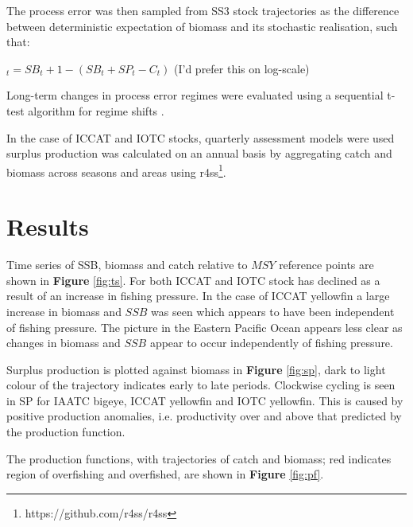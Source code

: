 \documentclass[12pt,doublespacing,a4paper]{ouparticle}
\begin{document}
The process error was then sampled from SS3 stock trajectories as the difference between deterministic expectation of biomass  and its stochastic realisation, such that:

\epsilon$_t = SB_t+1 - (SB_t+SP_t-C_t)$  (I'd prefer this on log-scale)

Long-term changes in process error regimes were evaluated using a sequential t-test algorithm for regime shifts \citep{rodionov2004sequential}.

 In the case of ICCAT and IOTC stocks, quarterly assessment models were used surplus production was calculated on an annual basis by aggregating catch and biomass across seasons and areas using r4ss\footnote{https://github.com/r4ss/r4ss}.
 
\section{Results}

Time series of SSB, biomass and catch relative to $MSY$ reference points are shown in \textbf{Figure} \ref{fig:ts}. For both ICCAT and IOTC stock has declined as a result of an increase in fishing pressure. In the case of ICCAT yellowfin a large increase in biomass and $SSB$ was seen which appears to have been independent of fishing pressure. The picture in the Eastern Pacific Ocean appears less clear as changes in biomass and $SSB$ appear to occur independently of fishing pressure.

Surplus production is plotted against biomass in \textbf{Figure} \ref{fig:sp}, dark to light colour of the trajectory indicates early to late periods. Clockwise cycling is seen in SP for IAATC bigeye, ICCAT yellowfin and IOTC yellowfin. This is caused by positive production anomalies, i.e. productivity over and above that predicted by the production function. 

The production functions, with trajectories of catch and biomass; red indicates region of overfishing and overfished, are shown in \textbf{Figure} \ref{fig:pf}.

\end{document}
